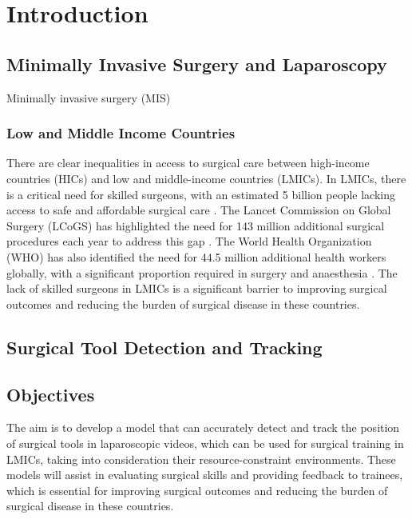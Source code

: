 \section{Introduction}

\subsection{Minimally Invasive Surgery and Laparoscopy}

Minimally invasive surgery (MIS)

\subsubsection{Low and Middle Income Countries}

There are clear inequalities in access to surgical care between high-income countries (HICs) and low and middle-income countries (LMICs). In LMICs, there is a critical need for skilled surgeons, with an estimated 5 billion people lacking access to safe and affordable surgical care \cite{meara_global_2015}. The Lancet Commission on Global Surgery (LCoGS) has highlighted the need for 143 million additional surgical procedures each year to address this gap \cite{meara_global_2015}. The World Health Organization (WHO) has also identified the need for 44.5 million additional health workers globally, with a significant proportion required in surgery and anaesthesia \cite{world_health_organization_global_2016}. The lack of skilled surgeons in LMICs is a significant barrier to improving surgical outcomes and reducing the burden of surgical disease in these countries.





\subsection{Surgical Tool Detection and Tracking}


\subsection{Objectives}

The aim is to develop a model that can accurately detect and track the position of surgical tools in laparoscopic videos, which can be used for surgical training in LMICs, taking into consideration their resource-constraint environments. These models will assist in evaluating surgical skills and providing feedback to trainees, which is essential for improving surgical outcomes and reducing the burden of surgical disease in these countries. 

